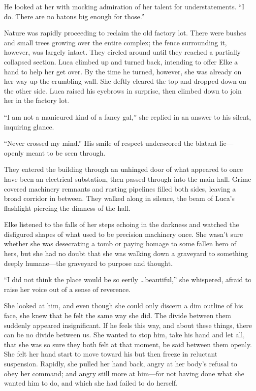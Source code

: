 He looked at her with mocking admiration of her talent for understatements. ``I do. There are no batons big enough for those.''

\sectionline

Nature was rapidly proceeding to reclaim the old factory lot. There were bushes and small trees growing over the entire complex; the fence surrounding it, however, was largely intact. They circled around until they reached a partially collapsed section. Luca climbed up and turned back, intending to offer Elke a hand to help her get over. By the time he turned, however, she was already on her way up the crumbling wall. She deftly cleared the top and dropped down on the other side. Luca raised his eyebrows in surprise, then climbed down to join her in the factory lot.

``I am not a manicured kind of a fancy gal,'' she replied in an answer to his silent, inquiring glance.

``Never crossed my mind.'' His smile of respect underscored the blatant lie---openly meant to be seen through.

They entered the building through an unhinged door of what appeared to once have been an electrical substation, then passed through into the main hall. Grime covered machinery remnants and rusting pipelines filled both sides, leaving a broad corridor in between. They walked along in silence, the beam of Luca's flashlight piercing the dimness of the hall.

Elke listened to the falls of her steps echoing in the darkness and watched the disfigured shapes of what used to be precision machinery once. She wasn't sure whether she was desecrating a tomb or paying homage to some fallen hero of hers, but she had no doubt that she was walking down a graveyard to something deeply humane---the graveyard to purpose and thought.

``I did not think the place would be so eerily \ldots beautiful,'' she whispered, afraid to raise her voice out of a sense of reverence.

She looked at him, and even though she could only discern a dim outline of his face, she knew that he felt the same way she did. The divide between them suddenly appeared insignificant. If he feels this way, and about these things, there can be no divide between us. She wanted to stop him, take his hand and let all, that she was so sure they both felt at that moment, be said between them openly. She felt her hand start to move toward his but then freeze in reluctant suspension. Rapidly, she pulled her hand back, angry at her body's refusal to obey her command; and angry still more at him---for not having done what she wanted him to do, and which she had failed to do herself.

